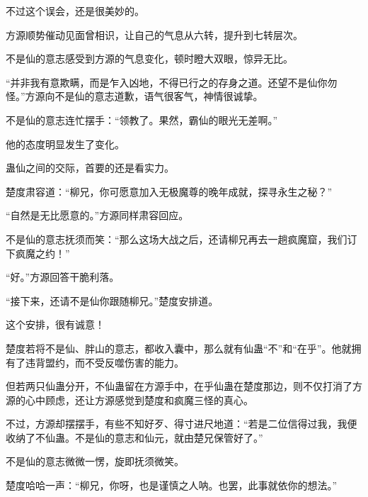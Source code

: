 \begin{this_body}
不过这个误会，还是很美妙的。

方源顺势催动见面曾相识，让自己的气息从六转，提升到七转层次。

不是仙的意志感受到方源的气息变化，顿时瞪大双眼，惊异无比。

“并非我有意欺瞒，而是乍入凶地，不得已行之的存身之道。还望不是仙你勿怪。”方源向不是仙的意志道歉，语气很客气，神情很诚挚。

不是仙的意志连忙摆手：“领教了。果然，霸仙的眼光无差啊。”

他的态度明显发生了变化。

蛊仙之间的交际，首要的还是看实力。

楚度肃容道：“柳兄，你可愿意加入无极魔尊的晚年成就，探寻永生之秘？”

“自然是无比愿意的。”方源同样肃容回应。

不是仙的意志抚须而笑：“那么这场大战之后，还请柳兄再去一趟疯魔窟，我们订下疯魔之约！”

“好。”方源回答干脆利落。

“接下来，还请不是仙你跟随柳兄。”楚度安排道。

这个安排，很有诚意！

楚度若将不是仙、胖山的意志，都收入囊中，那么就有仙蛊“不”和“在乎”。他就拥有了违背盟约，而不受反噬伤害的能力。

但若两只仙蛊分开，不仙蛊留在方源手中，在乎仙蛊在楚度那边，则不仅打消了方源的心中顾虑，还让方源感觉到楚度和疯魔三怪的真心。

不过，方源却摆摆手，有些不知好歹、得寸进尺地道：“若是二位信得过我，我便收纳了不仙蛊。不是仙的意志和仙元，就由楚兄保管好了。”

不是仙的意志微微一愣，旋即抚须微笑。

楚度哈哈一声：“柳兄，你呀，也是谨慎之人呐。也罢，此事就依你的想法。”

\end{this_body}

